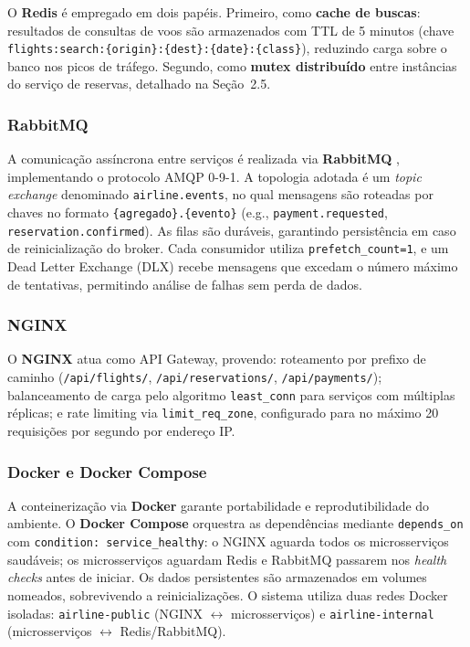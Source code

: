 \documentclass[12pt]{article}
\begin{document}
O \textbf{Redis} \cite{sanfilippo2009} é empregado em dois papéis. Primeiro, como
\textbf{cache de buscas}: resultados de consultas de voos são armazenados com TTL de 5
minutos (chave \texttt{flights:search:\{origin\}:\{dest\}:\{date\}:\{class\}}), reduzindo
carga sobre o banco nos picos de tráfego. Segundo, como \textbf{mutex distribuído} entre
instâncias do serviço de reservas, detalhado na Seção~2.5.

\subsubsection{RabbitMQ}

A comunicação assíncrona entre serviços é realizada via \textbf{RabbitMQ}
\cite{pivotal2007}, implementando o protocolo AMQP 0-9-1. A topologia adotada é um
\textit{topic exchange} denominado \texttt{airline.events}, no qual mensagens são
roteadas por chaves no formato \texttt{\{agregado\}.\{evento\}} (e.g.,
\texttt{payment.requested}, \texttt{reservation.confirmed}). As filas são duráveis,
garantindo persistência em caso de reinicialização do broker. Cada consumidor utiliza
\texttt{prefetch\_count=1}, e um Dead Letter Exchange (DLX) recebe mensagens que
excedam o número máximo de tentativas, permitindo análise de falhas sem perda de dados.

\subsubsection{NGINX}

O \textbf{NGINX} \cite{reese2008} atua como API Gateway, provendo: roteamento por
prefixo de caminho (\texttt{/api/flights/}, \texttt{/api/reservations/},
\texttt{/api/payments/}); balanceamento de carga pelo algoritmo \texttt{least\_conn}
para serviços com múltiplas réplicas; e rate limiting via \texttt{limit\_req\_zone},
configurado para no máximo 20 requisições por segundo por endereço IP.

\subsubsection{Docker e Docker Compose}

A conteinerização via \textbf{Docker} garante portabilidade e reprodutibilidade do
ambiente. O \textbf{Docker Compose} orquestra as dependências mediante \texttt{depends\_on}
com \texttt{condition: service\_healthy}: o NGINX aguarda todos os microsserviços
saudáveis; os microsserviços aguardam Redis e RabbitMQ passarem nos \textit{health checks}
antes de iniciar. Os dados persistentes são armazenados em volumes nomeados,
sobrevivendo a reinicializações. O sistema utiliza duas redes Docker isoladas:
\texttt{airline-public} (NGINX $\leftrightarrow$ microsserviços) e \texttt{airline-internal}
(microsserviços $\leftrightarrow$ Redis/RabbitMQ).
\end{document}

